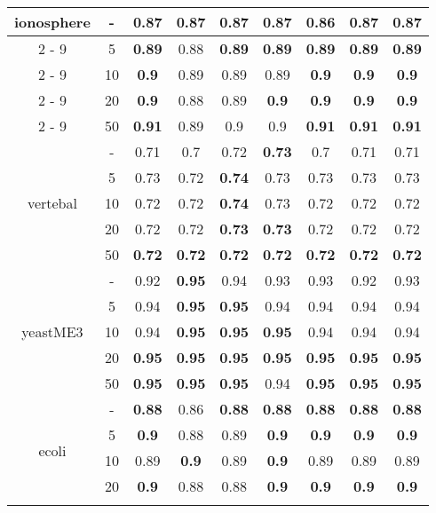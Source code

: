 \documentclass{article}%
\begin{document}
\begin{tabular}{c|c|ccccccc}
\hline%
\multirow{5}{*}{ionosphere}&{-}&\textbf{0.87}&\textbf{0.87}&\textbf{0.87}&\textbf{0.87}&0.86&\textbf{0.87}&\textbf{0.87}\\%
\cline{2%
-%
9}%
&5&\textbf{0.89}&0.88&\textbf{0.89}&\textbf{0.89}&\textbf{0.89}&\textbf{0.89}&\textbf{0.89}\\%
\cline{2%
-%
9}%
&10&\textbf{0.9}&0.89&0.89&0.89&\textbf{0.9}&\textbf{0.9}&\textbf{0.9}\\%
\cline{2%
-%
9}%
&20&\textbf{0.9}&0.88&0.89&\textbf{0.9}&\textbf{0.9}&\textbf{0.9}&\textbf{0.9}\\%
\cline{2%
-%
9}%
&50&\textbf{0.91}&0.89&0.9&0.9&\textbf{0.91}&\textbf{0.91}&\textbf{0.91}\\%
\hline%
\multirow{5}{*}{vertebal}&{-}&0.71&0.7&0.72&\textbf{0.73}&0.7&0.71&0.71\\%
\cline{2%
-%
9}%
&5&0.73&0.72&\textbf{0.74}&0.73&0.73&0.73&0.73\\%
\cline{2%
-%
9}%
&10&0.72&0.72&\textbf{0.74}&0.73&0.72&0.72&0.72\\%
\cline{2%
-%
9}%
&20&0.72&0.72&\textbf{0.73}&\textbf{0.73}&0.72&0.72&0.72\\%
\cline{2%
-%
9}%
&50&\textbf{0.72}&\textbf{0.72}&\textbf{0.72}&\textbf{0.72}&\textbf{0.72}&\textbf{0.72}&\textbf{0.72}\\%
\hline%
\multirow{5}{*}{yeastME3}&{-}&0.92&\textbf{0.95}&0.94&0.93&0.93&0.92&0.93\\%
\cline{2%
-%
9}%
&5&0.94&\textbf{0.95}&\textbf{0.95}&0.94&0.94&0.94&0.94\\%
\cline{2%
-%
9}%
&10&0.94&\textbf{0.95}&\textbf{0.95}&\textbf{0.95}&0.94&0.94&0.94\\%
\cline{2%
-%
9}%
&20&\textbf{0.95}&\textbf{0.95}&\textbf{0.95}&\textbf{0.95}&\textbf{0.95}&\textbf{0.95}&\textbf{0.95}\\%
\cline{2%
-%
9}%
&50&\textbf{0.95}&\textbf{0.95}&\textbf{0.95}&0.94&\textbf{0.95}&\textbf{0.95}&\textbf{0.95}\\%
\hline%
\multirow{5}{*}{ecoli}&{-}&\textbf{0.88}&0.86&\textbf{0.88}&\textbf{0.88}&\textbf{0.88}&\textbf{0.88}&\textbf{0.88}\\%
\cline{2%
-%
9}%
&5&\textbf{0.9}&0.88&0.89&\textbf{0.9}&\textbf{0.9}&\textbf{0.9}&\textbf{0.9}\\%
\cline{2%
-%
9}%
&10&0.89&\textbf{0.9}&0.89&\textbf{0.9}&0.89&0.89&0.89\\%
\cline{2%
-%
9}%
&20&\textbf{0.9}&0.88&0.88&\textbf{0.9}&\textbf{0.9}&\textbf{0.9}&\textbf{0.9}\\%
\cline{2%
-%
9}%

\end{tabular}
\end{document}
